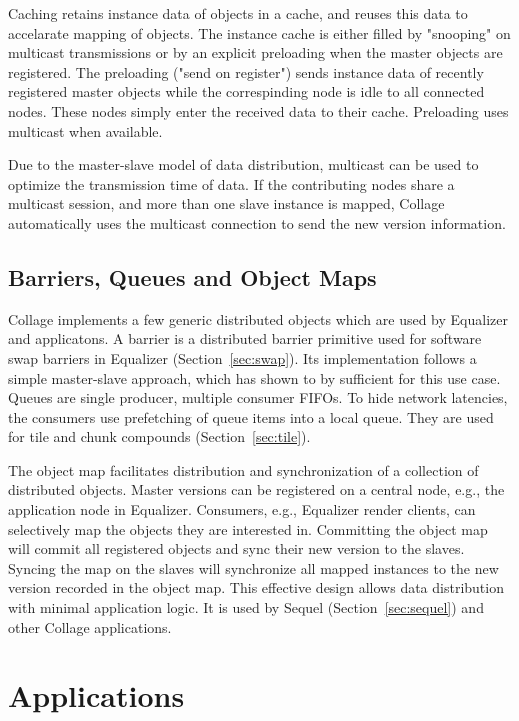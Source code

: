 \documentclass[10pt,journal,compsoc]{IEEEtran}
\newcommand{\sref}[1]{Section~\ref{#1}}
\begin{document}
Caching retains instance data of objects in a cache, and reuses this data to
accelarate mapping of objects. The instance cache is either filled by "snooping"
on multicast transmissions or by an explicit preloading when the master objects
are registered. The preloading ("send on register") sends instance data of
recently registered master objects while the correspinding node is idle to all
connected nodes. These nodes simply enter the received data to their
cache. Preloading uses multicast when available.

Due to the master-slave model of data distribution, multicast can be used to
optimize the transmission time of data. If the contributing nodes share a
multicast session, and more than one slave instance is mapped, Collage
automatically uses the multicast connection to send the new version
information.

\subsection{Barriers, Queues and Object Maps}\label{sec:barrier}

Collage implements a few generic distributed objects which are used by Equalizer
and applicatons. A barrier is a distributed barrier primitive used for software
swap barriers in Equalizer (\sref{sec:swap}). Its implementation follows a
simple master-slave approach, which has shown to by sufficient for this use
case. Queues are single producer, multiple consumer FIFOs. To hide network
latencies, the consumers use prefetching of queue items into a local queue. They
are used for tile and chunk compounds (\sref{sec:tile}).

The object map facilitates distribution and synchronization of a collection of
distributed objects. Master versions can be registered on a central node, e.g.,
the application node in Equalizer. Consumers, e.g., Equalizer render clients,
can selectively map the objects they are interested in. Committing the object
map will commit all registered objects and sync their new version to the
slaves. Syncing the map on the slaves will synchronize all mapped instances to
the new version recorded in the object map. This effective design allows data
distribution with minimal application logic. It is used by Sequel
(\sref{sec:sequel}) and other Collage applications.

\section{Applications}
\end{document}
